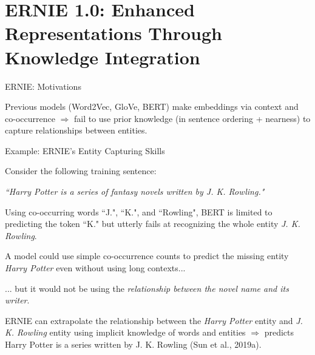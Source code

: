



\section{ERNIE 1.0: Enhanced Representations Through Knowledge Integration}


\begin{frame}{ERNIE: Motivations}

    \begin{itemizeSpaced}{2pt}
        \pinkbox Previous models (Word2Vec, GloVe, BERT) make embeddings via context and co-occurrence $\Rightarrow$ fail to use prior knowledge (in sentence ordering + nearness) to capture relationships between entities. 
    \end{itemizeSpaced}

    
    \begin{exampleBlock}{Example: ERNIE's Entity Capturing Skills}
        \normalsize\linespread{0.4}
        
        Consider the following training sentence: 
        
        {\large \textit{``Harry Potter is a series of fantasy novels written by J. K. Rowling."}}
        
        Using co-occurring words ``J.", ``K.", and ``Rowling", BERT is limited to predicting the token ``K." but utterly fails at recognizing the whole entity \emph{J. K. Rowling}. 
        
        A model could use simple co-occurrence counts to predict the missing entity \emph{Harry Potter} even without using long contexts... 
        
        ... but it would not be using the \emph{relationship between the novel name and its writer}. 
    \end{exampleBlock}

    \begin{itemizeSpaced}{2pt} 
        
         ERNIE can extrapolate the relationship between the \emph{Harry Potter} entity and \emph{J. K. Rowling} entity using implicit knowledge of words and entities $\Rightarrow$ predicts Harry Potter is a series written by J. K. Rowling (Sun et al., 2019a). 
    
    \end{itemizeSpaced}
    
\end{frame}


